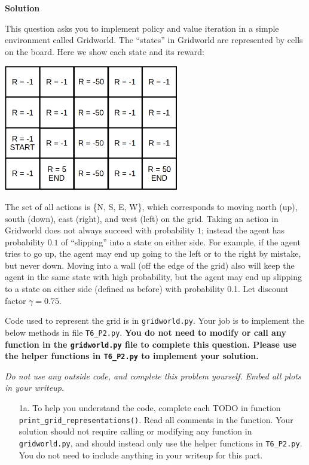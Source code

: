 \documentclass[submit]{harvardml}
\begin{document}
\textbf{Solution}


\begin{problem}

This question asks you to implement policy and value iteration in a simple environment called Gridworld.  The ``states'' in Gridworld are represented by cells on the board.  Here we show each state and its reward:

\begin{center}
\includegraphics[width=3in]{gridworld.png}
\end{center}

The set of all actions is \{N, S, E, W\}, which corresponds to moving north (up), south (down), east (right), and west (left) on the grid.  Taking an action in Gridworld does not always succeed with probability $1$; instead the agent has probability $0.1$ of ``slipping'' into a state on either side.  For example, if the agent tries to go up, the agent may end up going to the left or to the right by mistake, but never down.  Moving into a wall (off the edge of the grid) also will keep the agent in the same state with high probability, but the agent may end up slipping to a state on either side (defined as before) with probability 0.1.  Let discount factor $\gamma = 0.75$.

Code used to represent the grid is in \texttt{gridworld.py}.  Your job is to implement the below methods in file \texttt{T6\_P2.py}. \textbf{You do not need to modify or call any function in the \texttt{gridworld.py} file to complete this question.  Please use the helper functions in \texttt{T6\_P2.py} to implement your solution.}

\emph{Do not use any outside code, and complete this problem yourself.}
\emph{Embed all plots in your writeup.}
  
\begin{enumerate}

\item[1a.]To help you understand the code, complete each TODO in function \texttt{print\_grid\_representations()}. Read all comments in the function.  Your solution should not require calling or modifying any function in \texttt{gridworld.py}, and should instead only use the helper functions in \texttt{T6\_P2.py}.  You do not need to include anything in your writeup for this part.


\end{enumerate}
\end{problem}
\end{document}

